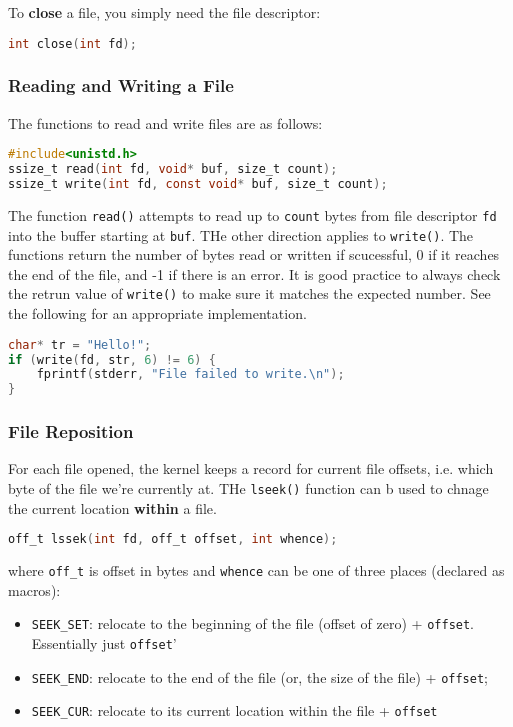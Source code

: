\documentclass{article}
\newcommand{\bold}[1]{\textbf{#1}}
\renewcommand{\b}{\item[$\circ$]}
\newcommand{\newlist}{\begin{itemize}}
\renewcommand{\endlist}{\end{itemize}}
\newcommand{\code}[1]{\texttt{#1}}
\begin{document}
To \bold{close} a file, you simply need the file descriptor:

\begin{lstlisting}[language=C]
int close(int fd);
\end{lstlisting}

\subsubsection{Reading and Writing a File}

The functions to read and write files are as follows: 

\begin{lstlisting}[language=C]
#include<unistd.h>
ssize_t read(int fd, void* buf, size_t count);
ssize_t write(int fd, const void* buf, size_t count);
\end{lstlisting}

The function \code{read()} attempts to read up to \code{count} bytes from file descriptor \code{fd} into the buffer starting at \code{buf}. THe other direction applies to \code{write()}. The functions return the number of bytes read or written if scucessful, 0 if it reaches the end of the file, and -1 if there is an error. It is good practice to always check the retrun value of \code{write()} to make sure it matches the expected number. See the following for an appropriate implementation.

\begin{lstlisting}[language=C]
char* tr = "Hello!";
if (write(fd, str, 6) != 6) { 
    fprintf(stderr, "File failed to write.\n");
}
\end{lstlisting}

\subsubsection{File Reposition}

For each file opened, the kernel keeps a record for current file offsets, i.e. which byte of the file we're currently at. THe \code{lseek()} function can b used to chnage the current location \bold{within} a file.

\begin{lstlisting}[language=C]
off_t lssek(int fd, off_t offset, int whence);
\end{lstlisting}

where \code{off\_t} is offset in bytes and \code{whence} can be one of three places (declared as macros):

\newlist
\b \code{SEEK\_SET}: relocate to the beginning of the file (offset of zero) + \code{offset}. Essentially just \code{offset}'
\b \code{SEEK\_END}: relocate to the end of the file (or, the size of the file) + \code{offset};
\b \code{SEEK\_CUR}: relocate to its current location within the file + \code{offset}
\endlist
\end{document}
